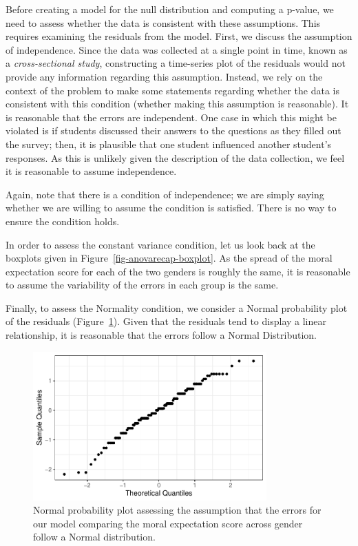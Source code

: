 \documentclass[
  letterpaper,
  DIV=11,
  numbers=noendperiod]{scrreprt}
\theoremstyle{definition}
\theoremstyle{definition}
\theoremstyle{plain}
\theoremstyle{remark}
\begin{document}
Before creating a model for the null distribution and computing a
p-value, we need to assess whether the data is consistent with these
assumptions. This requires examining the residuals from the model.
First, we discuss the assumption of independence. Since the data was
collected at a single point in time, known as a \emph{cross-sectional
study}, constructing a time-series plot of the residuals would not
provide any information regarding this assumption. Instead, we rely on
the context of the problem to make some statements regarding whether the
data is consistent with this condition (whether making this assumption
is reasonable). It is reasonable that the errors are independent. One
case in which this might be violated is if students discussed their
answers to the questions as they filled out the survey; then, it is
plausible that one student influenced another student's responses. As
this is unlikely given the description of the data collection, we feel
it is reasonable to assume independence.

Again, note that there is a condition of independence; we are simply
saying whether we are willing to assume the condition is satisfied.
There is no way to ensure the condition holds.

In order to assess the constant variance condition, let us look back at
the boxplots given in Figure~\ref{fig-anovarecap-boxplot}. As the spread
of the moral expectation score for each of the two genders is roughly
the same, it is reasonable to assume the variability of the errors in
each group is the same.

Finally, to assess the Normality condition, we consider a Normal
probability plot of the residuals
(Figure~\ref{fig-anovarecap-resids-probplot}). Given that the residuals
tend to display a linear relationship, it is reasonable that the errors
follow a Normal Distribution.

\begin{figure}

{\centering \includegraphics[width=0.8\textwidth,height=\textheight]{./images/fig-anovarecap-resids-probplot-1.pdf}

}

\caption{\label{fig-anovarecap-resids-probplot}Normal probability plot
assessing the assumption that the errors for our model comparing the
moral expectation score across gender follow a Normal distribution.}

\end{figure}
\end{document}
